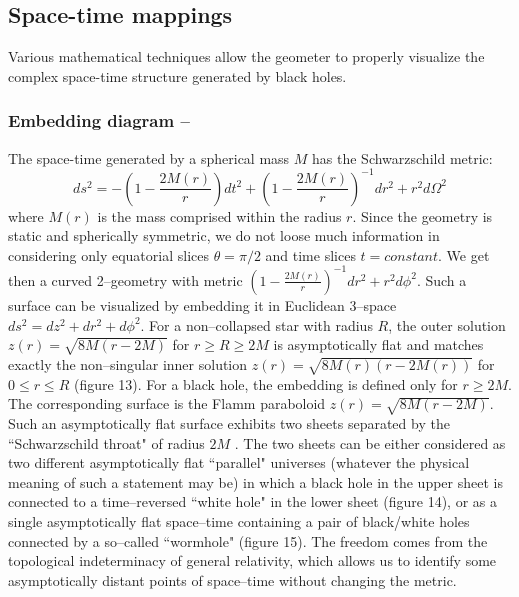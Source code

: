 \documentclass[12pt]{article}
\begin{document}
\subsection{Space-time mappings}

Various mathematical techniques allow the geometer to properly visualize 
the complex space-time structure generated by black holes. 

\subsubsection{Embedding diagram --}

The space-time generated by a spherical mass $M$ has the 
Schwarzschild metric:
\begin{equation}
ds^2 = - \left(1- \frac{2M(r)}{r}\right)dt^2
+ \left(1-\frac{2M(r)}{r}\right)^{-1}dr^2 + r^2 d\Omega^2        
\end{equation}
where $M(r)$ is the mass comprised within the radius $r$. Since the 
geometry is static and spherically symmetric, we do not loose much 
information in considering only equatorial slices $\theta = \pi/2$ 
and time slices $t = constant$. We get then a curved 2--geometry with 
metric $(1-\frac{2M(r)}{r})^{-1}dr^2 + r^2 d\phi^2$. Such a surface 
can be visualized by embedding it in Euclidean 3--space
$ds^{2} = dz^{2} + dr^{2} + 
d\phi^{2}$. For a non--collapsed star with radius $R$, the outer solution
$z(r) = \sqrt{8M(r-2M)}$ for $r\geq R 
\ge 2M$ is asymptotically flat and matches exactly the non--singular inner solution 
$z(r) = \sqrt{8M(r)(r-2M(r))}$ for $0 \le r\le R$ (figure 13). For a 
black hole, the embedding is defined only for $r \geq 2M$. The 
corresponding surface is the Flamm paraboloid  $z(r) = 
\sqrt{8M(r-2M)}$. Such an asymptotically flat surface exhibits two 
sheets separated by the ``Schwarzschild throat" of radius $2M$ . The two sheets can be either considered as two 
different asymptotically flat ``parallel" universes (whatever the physical meaning of such 
a statement may be) in which a black hole in the upper sheet is 
connected 
to a time--reversed ``white hole" in the lower sheet (figure 14), or 
as a single asymptotically flat space--time containing a pair of 
black/white holes connected by a so--called ``wormhole" (figure 15). The freedom 
comes from the topological indeterminacy of general relativity, 
which allows us to identify some asymptotically distant points of 
space--time without changing the metric. 
\end{document}
